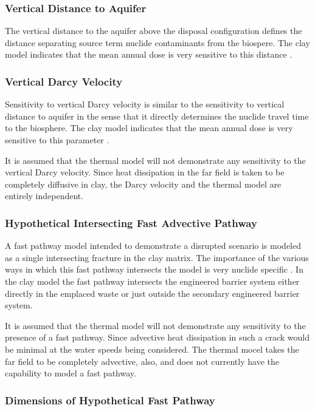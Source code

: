 \subsubsection{Vertical Distance to Aquifer}

The vertical distance to the aquifer above the disposal configuration defines 
the distance separating source term nuclide contaminants from the biospere. The 
clay model indicates that the mean annual dose is very sensitive to this 
distance \cite{clayton_generic_2011}.

\subsubsection{Vertical Darcy Velocity}

Sensitivity to vertical Darcy velocity is similar to the sensitivity to vertical 
distance to aquifer in the sense that it directly determines the nuclide travel 
time to the biosphere. The clay model indicates that the mean annual dose is 
very sensitive to this parameter \cite{clayton_generic_2011}.

It is assumed that the thermal model will not demonstrate any
sensitivity to the vertical Darcy velocity. Since heat dissipation in the far 
field is taken to be completely diffusive in clay, the Darcy velocity and the 
thermal model are entirely independent.

\subsubsection{Hypothetical Intersecting Fast Advective Pathway}

A fast pathway model intended to demonstrate a disrupted scenario is modeled as 
a single intersecting fracture in the clay matrix. The importance of the various 
ways in which this fast pathway intersects the model is very nuclide specific 
\cite{clayton_generic_2011}. In the clay model the fast pathway intersects the 
engineered barrier system either directly in the emplaced waste or just outside 
the secondary engineered barrier system.

It is assumed that the thermal model will not demonstrate any
sensitivity to the presence of a fast pathway. Since advective heat dissipation 
in such a crack would be minimal at the water speeds being considered. The 
thermal mocel takes the far field to be completely advective, also, and does not 
currently have the capability to model a fast pathway.

\subsubsection{Dimensions of Hypothetical Fast Pathway}

